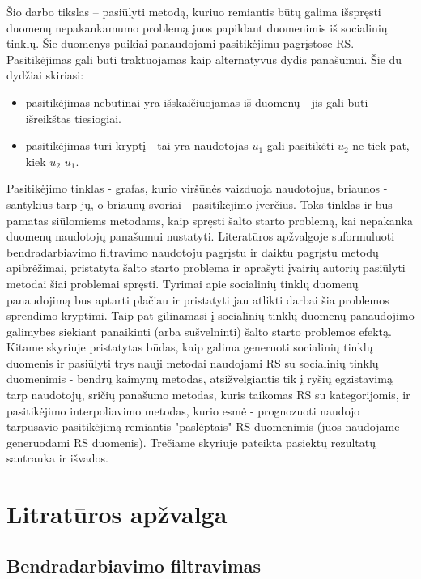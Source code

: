 \documentclass{VUMIFInfMagistrinis}
\begin{document}
\newline
\indent
Šio darbo tikslas – pasiūlyti metodą, kuriuo remiantis būtų galima išspręsti duomenų nepakankamumo problemą juos papildant duomenimis iš socialinių tinklų. Šie duomenys puikiai panaudojami pasitikėjimu pagrįstose RS. Pasitikėjimas gali būti traktuojamas kaip alternatyvus dydis panašumui. Šie du dydžiai skiriasi:
\begin{itemize}
	\item pasitikėjimas nebūtinai yra išskaičiuojamas iš duomenų - jis gali būti išreikštas tiesiogiai.
	\item pasitikėjimas turi kryptį - tai yra naudotojas $u_1$ gali pasitikėti $u_2$ ne tiek pat, kiek $u_2$ $u_1$.
\end{itemize}
Pasitikėjimo tinklas - grafas, kurio viršūnės vaizduoja naudotojus, briaunos - santykius tarp jų, o briaunų svoriai - pasitikėjimo įverčius. Toks tinklas ir bus pamatas siūlomiems metodams, kaip spręsti šalto starto problemą, kai nepakanka duomenų naudotojų panašumui nustatyti.
\newline
\indent 
Literatūros apžvalgoje suformuluoti bendradarbiavimo filtravimo naudotoju pagrįstu ir daiktu pagrįstu metodų apibrėžimai, pristatyta šalto starto problema ir aprašyti įvairių autorių pasiūlyti metodai šiai problemai spręsti. Tyrimai apie socialinių tinklų duomenų panaudojimą bus aptarti plačiau ir pristatyti jau atlikti darbai šia problemos sprendimo kryptimi. Taip pat gilinamasi į socialinių tinklų duomenų panaudojimo galimybes siekiant panaikinti (arba sušvelninti) šalto starto problemos efektą. Kitame skyriuje pristatytas būdas, kaip galima generuoti socialinių tinklų duomenis ir pasiūlyti trys nauji metodai naudojami RS su socialinių tinklų duomenimis - bendrų kaimynų metodas, atsižvelgiantis tik į ryšių egzistavimą tarp naudotojų, sričių panašumo metodas, kuris taikomas RS su kategorijomis, ir pasitikėjimo interpoliavimo metodas, kurio esmė - prognozuoti naudojo tarpusavio pasitikėjimą remiantis "paslėptais" RS duomenimis (juos naudojame generuodami RS duomenis). Trečiame skyriuje pateikta pasiektų rezultatų santrauka ir išvados.


\section{Litratūros apžvalga}
\subsection{Bendradarbiavimo filtravimas}
\end{document}
